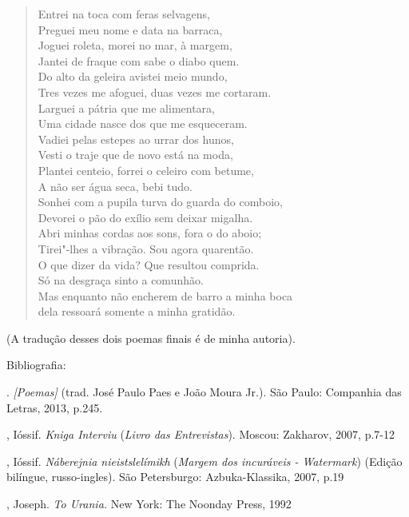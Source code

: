 \begin{verse}
Entrei na toca com feras selvagens, \\
Preguei meu nome e data na barraca, \\
Joguei roleta, morei no mar, à margem, \\
Jantei de fraque com sabe o diabo quem. \\[8pt]
Do alto da geleira avistei meio mundo, \\
Tres vezes me afoguei, duas vezes me \qb{}cortaram. \\
Larguei a pátria que me alimentara, \\
Uma cidade nasce dos que me esqueceram. \\[8pt]
Vadiei pelas estepes ao urrar dos hunos, \\
Vesti o traje que de novo está na moda, \\
Plantei centeio, forrei o celeiro com betume, \\
A não ser água seca, bebi tudo. \\[8pt]
Sonhei com a pupila turva do guarda do \qb{}comboio, \\
Devorei o pão do exílio sem deixar migalha. \\
Abri minhas cordas aos sons, fora o do aboio; \\
Tirei"-lhes a vibração. Sou agora quarentão. \\[8pt]
O que dizer da vida? Que resultou comprida. \\
Só na desgraça sinto a comunhão. \\
Mas enquanto não encherem de barro a \qb{}minha boca \\
dela ressoará somente a minha gratidão.
\end{verse}

(A tradução desses dois poemas finais é de minha autoria).

Bibliografia:

. \emph{ [Poemas]} (trad. José Paulo Paes e
João Moura Jr.). São Paulo: Companhia das Letras, 2013, p.245.

, Ióssif. \emph{Kniga Interviu} (\emph{Livro das Entrevistas}).
Moscou: Zakharov, 2007, p.7-12

, Ióssif. \emph{Náberejnia nieistslelímikh} (\emph{Margem dos
incuráveis - Watermark}) (Edição bilíngue, russo-ingles). São
Petersburgo: Azbuka-Klassika, 2007, p.19

, Joseph. \emph{To Urania.} New York: The Noonday Press, 1992

